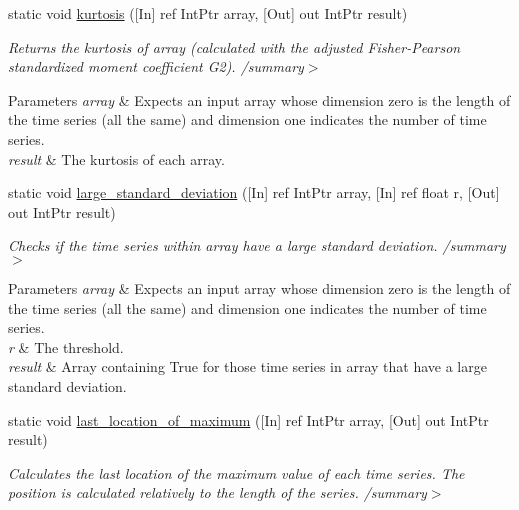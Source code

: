 \begin{DoxyCompactItemize}
static void \mbox{\hyperlink{classkhiva_1_1interop_1_1_d_l_l_features_a97470f56bfa5bd147e77adeab9bb6873}{kurtosis}} (\mbox{[}In\mbox{]} ref Int\+Ptr array, \mbox{[}Out\mbox{]} out Int\+Ptr result)
\begin{DoxyCompactList}\small\item\em Returns the kurtosis of array (calculated with the adjusted Fisher-\/\+Pearson standardized moment coefficient G2). /summary$>$ 
\begin{DoxyParams}{Parameters}
{\em array} & Expects an input array whose dimension zero is the length of the time series (all the same) and dimension one indicates the number of time series.\\
\hline
{\em result} & The kurtosis of each array.\\
\hline
\end{DoxyParams}
\end{DoxyCompactList}\item 
static void \mbox{\hyperlink{classkhiva_1_1interop_1_1_d_l_l_features_a9c7f3b29bebee0b1fa4b091d27390cf8}{large\+\_\+standard\+\_\+deviation}} (\mbox{[}In\mbox{]} ref Int\+Ptr array, \mbox{[}In\mbox{]} ref float r, \mbox{[}Out\mbox{]} out Int\+Ptr result)
\begin{DoxyCompactList}\small\item\em Checks if the time series within array have a large standard deviation. /summary$>$ 
\begin{DoxyParams}{Parameters}
{\em array} & Expects an input array whose dimension zero is the length of the time series (all the same) and dimension one indicates the number of time series.\\
\hline
{\em r} & The threshold.\\
\hline
{\em result} & Array containing True for those time series in array that have a large standard deviation.\\
\hline
\end{DoxyParams}
\end{DoxyCompactList}\item 
static void \mbox{\hyperlink{classkhiva_1_1interop_1_1_d_l_l_features_a930c49b2c612bcb8385f3553d893bfba}{last\+\_\+location\+\_\+of\+\_\+maximum}} (\mbox{[}In\mbox{]} ref Int\+Ptr array, \mbox{[}Out\mbox{]} out Int\+Ptr result)
\begin{DoxyCompactList}\small\item\em Calculates the last location of the maximum value of each time series. The position is calculated relatively to the length of the series. /summary$>$ 

\end{DoxyCompactList}
\end{DoxyCompactItemize}
